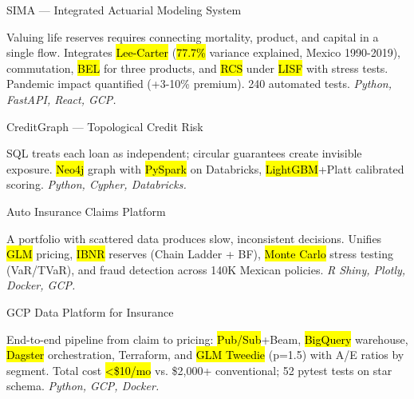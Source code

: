 \documentclass[10pt, letterpaper]{awesome-cv}
\begin{document}
\begin{cventries}

  \cventry
    {SIMA — Integrated Actuarial Modeling System}
    {}
    {}
    {}
    {
      \begin{cvitems}
        \item {Valuing life reserves requires connecting mortality, product, and capital in a single flow. Integrates \hl{Lee-Carter} (\hl{77.7\%} variance explained, Mexico 1990-2019), commutation, \hl{BEL} for three products, and \hl{RCS} under \hl{LISF} with stress tests. Pandemic impact quantified (+3-10\% premium). 240 automated tests. \textit{Python, FastAPI, React, GCP.}}
      \end{cvitems}
    }

  \cventry
    {CreditGraph — Topological Credit Risk}
    {}
    {}
    {}
    {
      \begin{cvitems}
        \item {SQL treats each loan as independent; circular guarantees create invisible exposure. \hl{Neo4j} graph with \hl{PySpark} on Databricks, \hl{LightGBM}+Platt calibrated scoring. \textit{Python, Cypher, Databricks.}}
      \end{cvitems}
    }

  \cventry
    {Auto Insurance Claims Platform}
    {}
    {}
    {}
    {
      \begin{cvitems}
        \item {A portfolio with scattered data produces slow, inconsistent decisions. Unifies \hl{GLM} pricing, \hl{IBNR} reserves (Chain Ladder + BF), \hl{Monte Carlo} stress testing (VaR/TVaR), and fraud detection across 140K Mexican policies. \textit{R Shiny, Plotly, Docker, GCP.}}
      \end{cvitems}
    }

  \cventry
    {GCP Data Platform for Insurance}
    {}
    {}
    {}
    {
      \begin{cvitems}
        \item {End-to-end pipeline from claim to pricing: \hl{Pub/Sub}+Beam, \hl{BigQuery} warehouse, \hl{Dagster} orchestration, Terraform, and \hl{GLM Tweedie} (p=1.5) with A/E ratios by segment. Total cost \hl{<\$10/mo} vs. \$2,000+ conventional; 52 pytest tests on star schema. \textit{Python, GCP, Docker.}}
      \end{cvitems}
    }

\end{cventries}
\end{document}
